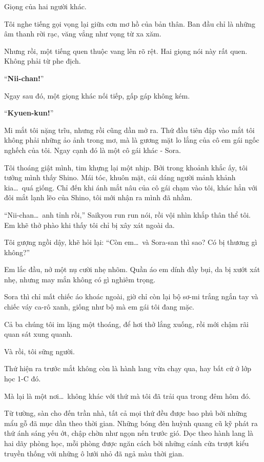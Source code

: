 \documentclass[../main.tex]{subfiles}
\begin{document}
Giọng của hai người khác.

Tôi nghe tiếng gọi vọng lại giữa cơn mơ hồ của bản thân. Ban đầu chỉ là những âm thanh rời rạc, văng vẳng như vọng từ xa xăm.

Nhưng rồi, một tiếng quen thuộc vang lên rõ rệt. Hai giọng nói này rất quen. Không phải từ phe địch.

``\textbf{Nii-chan!}''

Ngay sau đó, một giọng khác nối tiếp, gấp gáp không kém.

``\textbf{Kyuen-kun!}''

Mi mắt tôi nặng trĩu, nhưng rồi cũng dần mở ra. Thứ đầu tiên đập vào mắt tôi không phải những ảo ảnh trong mơ, mà là gương mặt lo lắng của cô em gái ngốc nghếch của tôi. Ngay cạnh đó là một cô gái khác - Sora.

Tôi thoáng giật mình, tim khựng lại một nhịp. Bởi trong khoảnh khắc ấy, tôi tưởng mình thấy Shino. Mái tóc, khuôn mặt, cái dáng người mảnh khảnh kia\dots\ quá giống. Chỉ đến khi ánh mắt nâu của cô gái chạm vào tôi, khác hẳn với đôi mắt lạnh lẽo của Shino, tôi mới nhận ra mình đã nhầm.

``Nii-chan\dots\ anh tỉnh rồi,'' Saikyou run run nói, rồi vội nhìn khắp thân thể tôi. Em khẽ thở phào khi thấy tôi chỉ bị xây xát ngoài da.

Tôi gượng ngồi dậy, khẽ hỏi lại: ``Còn em\dots\ và Sora-san thì sao? Có bị thương gì không?''

Em lắc đầu, nở một nụ cười nhẹ nhõm. Quần áo em dính đầy bụi, da bị xướt xát nhẹ, nhưng may mắn không có gì nghiêm trọng.

Sora thì chỉ mất chiếc áo khoác ngoài, giờ chỉ còn lại bộ sơ-mi trắng ngắn tay và chiếc váy ca-rô xanh, giống như bộ mà em gái tôi đang mặc.

Cả ba chúng tôi im lặng một thoáng, để hơi thở lắng xuống, rồi mới chậm rãi quan sát xung quanh.

Và rồi, tôi sững người.

Thứ hiện ra trước mắt không còn là hành lang vừa chạy qua, hay bất cứ ở lớp học 1-C đó.

Mà lại là một nơi\dots\ không khác với thứ mà tôi đã trải qua trong đêm hôm đó.


Từ tường, sàn cho đến trần nhà, tất cả mọi thứ đều được bao phủ bởi những mẩu gỗ đã mục dần theo thời gian. Những bóng đèn huỳnh quang cũ kỹ phát ra thứ ánh sáng yếu ớt, chập chờn như ngọn nến trước gió. Dọc theo hành lang là hai dãy phòng học, mỗi phòng được ngăn cách bởi những cánh cửa trượt kiểu truyền thống với những ô lưới nhỏ đã ngả màu thời gian.
\end{document}
